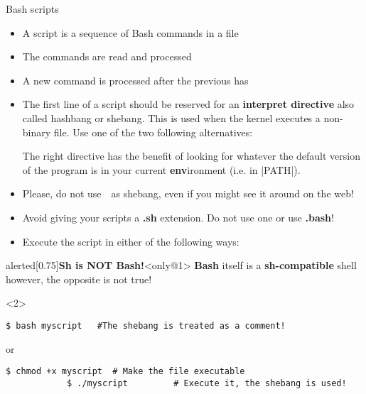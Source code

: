 \begin{frame}[fragile]{Bash scripts}
    \vspace{-6mm}
    \begin{itemize}
        \item A script is a sequence of Bash commands in a file
        \item The commands are read and processed 
        \item A new command is processed after the previous has  
        \item The first line of a script should be reserved for an \textbf{interpret directive} also called \alert{hashbang} or \alert{shebang}.
              This is used when the kernel executes a non-binary file.
              Use one of the two following alternatives: \\
              \begin{center}
                  \par{\ssmall The right directive has the benefit of looking for whatever the default version of the program is in your current \textbf{env}ironment (i.e. in \bash|PATH|).}
              \end{center}
        \item<only@1> Please, \alert{do not use} \,\, as shebang, even if you might see it around on the web!
        \item<only@1> Avoid giving your scripts a \textbf{.sh} extension. Do not use one or use \alert{\textbf{.bash}}!
        \item<only@2> Execute the script in either of the following ways:
    \end{itemize}
    \begin{varblock}{alerted}[0.75\textwidth]{\textbf{Sh is NOT Bash!}}<only@1>
        \textbf{Bash} itself is a \textbf{sh-compatible} shell however, the opposite is not true!
    \end{varblock}
    \begin{onlyenv}<2>
        \begin{lstlisting}[style=MyBash]
            $ bash myscript   #The shebang is treated as a comment!
        \end{lstlisting}
        \centerline{or}
        \begin{lstlisting}[style=MyBash]
            $ chmod +x myscript  # Make the file executable
            $ ./myscript         # Execute it, the shebang is used!
        \end{lstlisting}
    \end{onlyenv}
\end{frame}


